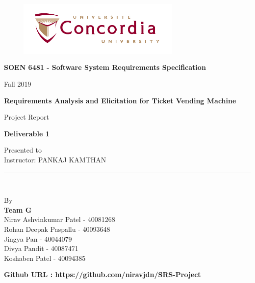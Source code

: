 \documentclass[11pt, english]{report}
\begin{document}
\begin{titlepage}

\begin{center}
\vspace*{-1in}
\begin{figure}[htb]
\begin{center}
\includegraphics[width=8cm]{images/logo.png}
\end{center}
\end{figure}
\begin{Large}
\textbf{SOEN 6481 - Software System Requirements Specification} \\
\end{Large}
\vspace*{0.1in}
Fall 2019\\
\vspace*{0.5in}
\begin{Large}
\textbf{Requirements Analysis and Elicitation for Ticket Vending Machine} \\
\end{Large}
\vspace*{0.4in}
\begin{large}
Project Report\\
\end{large}
\vspace*{0.2in}
\begin{Large}
\textbf{Deliverable 1} \\
\end{Large}
\vspace*{0.3in}
\begin{large}
Presented to \\
\vspace*{0.1in}
Instructor: PANKAJ KAMTHAN 
 \\
\end{large}
\vspace*{0.3in}
\rule{80mm}{0.1mm}\\
\vspace*{0.1in}
\begin{large}
By \\
\textbf{Team G}\\
Nirav Ashvinkumar Patel - 40081268\\
Rohan Deepak Paspallu - 40093648\\
Jingya Pan - 40044079\\
Divya Pandit - 40087471 \\
Koshaben Patel - 40094385 \\


\end{large}
\vspace*{0.3in}
\textbf{Github URL : https://github.com/niravjdn/SRS-Project}
\end{center}
\end{titlepage}
\end{document}
